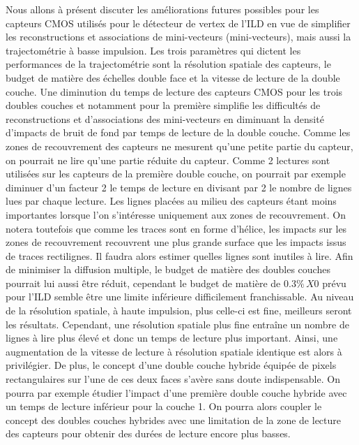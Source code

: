   Nous allons \`a pr\'esent discuter les am\'eliorations futures possibles pour les capteurs CMOS utilis\'es pour le d\'etecteur de vertex de l'ILD en vue de simplifier les reconstructions et associations de mini-vecteurs (mini-vecteurs), mais aussi la trajectom\'etrie \`a basse impulsion. Les trois param\`etres qui dictent les performances de la trajectom\'etrie sont la r\'esolution spatiale des capteurs, le budget de mati\`ere des \'echelles double face et la vitesse de lecture de la double couche. Une diminution du temps de lecture des capteurs CMOS pour les trois doubles couches et notamment pour la premi\`ere simplifie les difficult\'es de reconstructions et d'associations des mini-vecteurs en diminuant la densit\'e d'impacts de bruit de fond par temps de lecture de la double couche. Comme les zones de recouvrement des capteurs ne mesurent qu'une petite partie du capteur, on pourrait ne lire qu'une partie r\'eduite du capteur. Comme 2 lectures sont utilis\'ees sur les capteurs de la premi\`ere double couche, on pourrait par exemple diminuer d'un facteur 2 le temps de lecture en divisant par 2 le nombre de lignes lues par chaque lecture. Les lignes plac\'ees au milieu des capteurs étant moins importantes lorsque l'on s'intéresse uniquement aux zones de recouvrement. On notera toutefois que comme les traces sont en forme d'h\'elice, les impacts sur les zones de recouvrement recouvrent une plus grande surface que les impacts issus de traces rectilignes. Il faudra alors estimer quelles lignes sont inutiles \`a lire. Afin de minimiser la diffusion multiple, le budget de mati\`ere des doubles couches pourrait lui aussi \^etre r\'eduit, cependant le budget de mati\`ere de $0.3\% \, X0$ pr\'evu pour l'ILD semble \^etre une limite inf\'erieure difficilement franchissable. Au niveau de la r\'esolution spatiale, \`a haute impulsion, plus celle-ci est fine, meilleurs seront les r\'esultats. Cependant, une r\'esolution spatiale plus fine entra\^ine un nombre de lignes \`a lire plus \'elev\'e et donc un temps de lecture plus important. Ainsi, une augmentation de la vitesse de lecture \`a r\'esolution spatiale identique est alors \`a privil\'egier. De plus, le concept d'une double couche hybride \'equipée de pixels rectangulaires sur l'une de ces deux faces s'av\`ere sans doute indispensable. On pourra par exemple \'etudier l'impact d'une premi\`ere double couche hybride avec un temps de lecture inf\'erieur pour la couche 1. On pourra alors coupler le concept des doubles couches hybrides avec une limitation de la zone de lecture des capteurs pour obtenir des dur\'ees de lecture encore plus basses.
  
